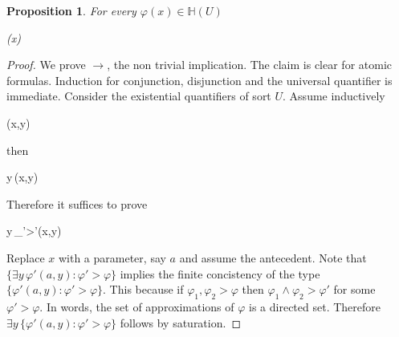 \documentclass[11pt,oneside]{amsart}
\newcommand*{\TakeFourierOrnament}[1]{{%
\fontencoding{U}\fontfamily{futs}\selectfont\char#1}}
\renewcommand*{\danger}{\TakeFourierOrnament{66}}
\theoremstyle{plain}
\newtheorem{proposition}[theorem]{Proposition}
\theoremstyle{remark}
\begin{document}
\begin{proposition}\label{prop_approx}
  For every $\varphi(x)\in\mathds{H}(U)$ 

  {\leftrightarrow}
  {\varphi(x)}

\end{proposition}

\begin{proof}
  We prove $\rightarrow$, the non trivial implication.
  The claim is clear for atomic formulas.
  Induction for conjunction, disjunction and the universal quantifier is immediate.
%
%
%
%
%
  Consider the existential quantifiers of sort $U$.
  Assume inductively
  
  {\rightarrow}
  {\varphi(x,y)}

  then 

  {\rightarrow}
  {\exists y\,\varphi(x,y)}

  Therefore it suffices to prove

  {\rightarrow}
  {\exists y\,\bigwedge_{\varphi'>\varphi}\varphi'(x,y)}

Replace $x$ with a parameter, say $a$ and assume the antecedent.
Note that $\{\exists y\,\varphi'(a,y):\varphi'>\varphi\}$ implies the finite concistency of the type $\{\varphi'(a,y):\varphi'>\varphi\}$.
This because if $\varphi_1,\varphi_2>\varphi$ then $\varphi_1\wedge\varphi_2>\varphi'$ for some $\varphi'>\varphi$.
In words, the set of approximations of $\varphi$ is a directed set.
Therefore $\exists y\,\{\varphi'(a,y):\varphi'>\varphi\}$ follows by saturation.
%
%
%
%
%
\end{proof}
\end{document}
